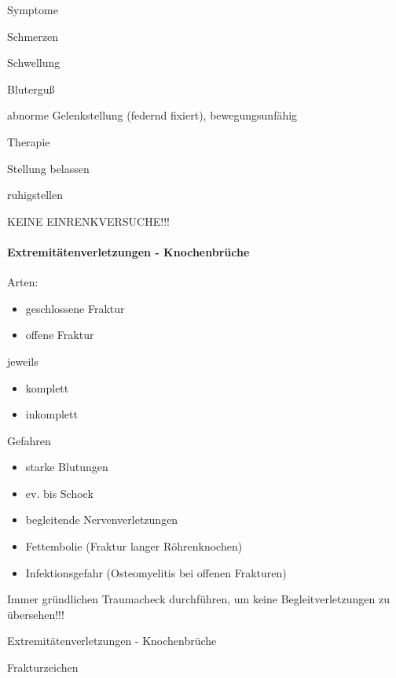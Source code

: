 \documentclass{article}
\begin{document}
Symptome

Schmerzen

Schwellung

Blutergu{\ss}

abnorme Gelenkstellung (federnd fixiert), bewegungsunf\"ahig

Therapie

Stellung belassen

ruhigstellen

KEINE EINRENKVERSUCHE!!!

\paragraph[Extremit\"atenverletzungen -
\ Knochenbr\"uche]{Extremit\"atenverletzungen -  Knochenbr\"uche}
Arten:

\begin{itemize}
\item geschlossene Fraktur

\item offene Fraktur

\end{itemize}
jeweils

\begin{itemize}
\item komplett

\item inkomplett

\end{itemize}
Gefahren

\begin{itemize}
\item starke Blutungen

\item ev. bis Schock

\item begleitende Nervenverletzungen

\item Fettembolie (Fraktur langer R\"ohrenknochen)

\item Infektionsgefahr (Osteomyelitis bei offenen  Frakturen)

\end{itemize}
Immer gr\"undlichen Traumacheck  durchf\"uhren, um keine 
Begleitverletzungen zu \"ubersehen!!!

Extremit\"atenverletzungen -  Knochenbr\"uche

Frakturzeichen
\end{document}
